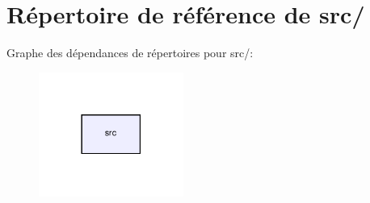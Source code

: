 \section{Répertoire de référence de src/}
\label{dir_68267d1309a1af8e8297ef4c3efbcdba}
Graphe des dépendances de répertoires pour src/\-:\nopagebreak
\begin{figure}[H]
\begin{center}
\leavevmode
\includegraphics[width=134pt]{dir_68267d1309a1af8e8297ef4c3efbcdba_dep}
\end{center}
\end{figure}
